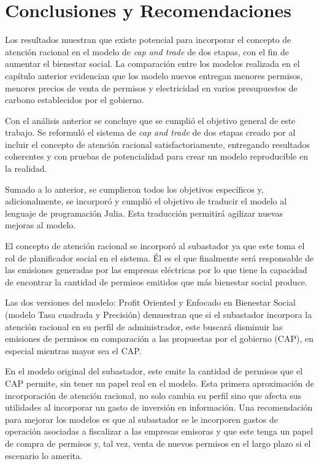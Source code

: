 \chapter{Conclusiones y Recomendaciones}
\label{c5} %

Los resultados muestran que existe potencial para incorporar el concepto de atención racional en el modelo de \textit{cap and trade} de dos etapas, con el fin de aumentar el bienestar social. La comparación entre los modelos realizada en el capítulo anterior evidencian que los modelo nuevos entregan menores permisos, menores precios de venta de permisos y electricidad en varios presupuestos de carbono establecidos por el gobierno.
\vspace{2.5mm}

Con el análisis anterior se concluye que se cumplió el objetivo general de este trabajo. Se reformuló el sistema de \textit{cap and trade} de dos etapas creado por  al incluir el concepto de atención racional satisfactoriamente, entregando resultados coherentes y con pruebas de potencialidad para crear un modelo reproducible en la realidad.
\vspace{2.5mm}

Sumado a lo anterior, se cumplieron todos los objetivos específicos y, adicionalmente, se incorporó y cumplió el objetivo de traducir el modelo al lenguaje de programación Julia. Esta traducción permitirá agilizar nuevas mejoras al modelo. 
\vspace{2.5mm}

El concepto de atención racional se incorporó al subastador ya que este toma el rol de planificador social en el sistema. Él es el que finalmente será responsable de las emisiones generadas por las empresas eléctricas por lo que tiene la capacidad de encontrar la cantidad de permisos emitidos que más bienestar social produce.
\vspace{2.5mm}

Las dos versiones del modelo: Profit Oriented y Enfocado en Bienestar Social (modelo Tasa cuadrada y Precisión) demuestran que si el subastador incorpora la atención racional en su perfil de administrador, este buscará disminuir las emisiones de permisos en comparación a las propuestas por el gobierno (CAP), en especial mientras mayor sea el CAP. 
\vspace{2.5mm}

En el modelo original del subastador, este emite la cantidad de permisos que el CAP permite, sin tener un papel real en el modelo. Esta primera aproximación de incorporación de atención racional, no solo cambia su perfil sino que afecta sus utilidades al incorporar un gasto de inversión en información. Una recomendación para mejorar los modelos es que al subastador se le incorporen gastos de operación asociadas a fiscalizar a las empresas emisoras y que este tenga un papel de compra de permisos y, tal vez, venta de nuevos permisos en el largo plazo si el escenario lo amerita.
\vspace{2.5mm}

